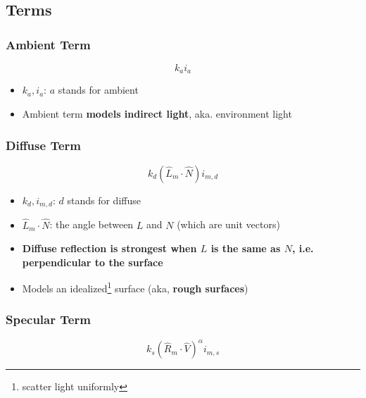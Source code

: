 \subsection{Terms}

  \subsubsection{Ambient Term}

    \begin{equation}
      k_{a} i_{a}
    \end{equation}

    \begin{itemize}
      \item $ k_{a}, i_{a} $: $ a $ stands for ambient
      \item Ambient term \textbf{models indirect light}, aka. environment light
    \end{itemize}

  \subsubsection{Diffuse Term}

    \begin{equation}
      k_{d} \left( \hat{L}_{m} \cdot \hat{N} \right) i_{m, d}
    \end{equation}

    \begin{itemize}
      \item $ k_{d}, i_{m, d} $: $ d $ stands for diffuse
      \item $ \hat{L}_{m} \cdot \hat{N} $: the angle between $ L $ and $ N $
      (which are unit vectors)
      \item \textbf{Diffuse reflection is strongest when $ L $ is
      the same as $ N $, i.e. perpendicular to the surface}
      \item Models an idealized\footnote{scatter light uniformly} surface
      (aka, \textbf{rough surfaces})
    \end{itemize}

  \subsubsection{Specular Term}

    \begin{equation}
      k_{s} \left( \hat{R}_{m} \cdot \hat{V} \right)^{\alpha} i_{m, s}
    \end{equation}

